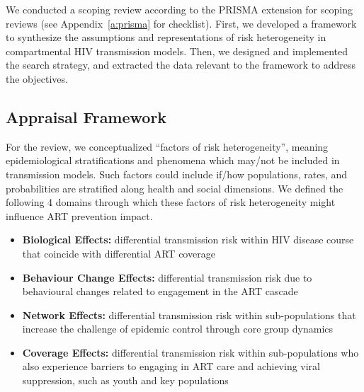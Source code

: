 We conducted a scoping review according to the PRISMA extension for scoping reviews
(see Appendix~\ref{a:prisma} for checklist).
First, we developed a framework to synthesize  %
the assumptions and representations of risk heterogeneity
in compartmental HIV transmission models.
Then, we designed and implemented the search strategy,
and extracted the data relevant to the framework
to address the objectives.
\subsection{Appraisal Framework}  %
\label{ss:meth:framework}
For the review, we conceptualized ``factors of risk heterogeneity'', meaning
epidemiological stratifications and phenomena which may/not be included in transmission models.
Such factors could include if/how populations, rates, and probabilities
are stratified along health and social dimensions.
We defined the following 4 domains through which
these factors of risk heterogeneity might influence ART prevention impact.
\begin{itemize}
  \item \textbf{Biological Effects:}
  differential transmission risk within HIV disease course
  that coincide with differential ART coverage
  \cite{Pilcher2004}
  \item \textbf{Behaviour Change Effects:}
  differential transmission risk due to
  behavioural changes related to engagement in the ART cascade
  \cite{Ramachandran2016,Tiwari2020} %
  \item \textbf{Network Effects:}
  differential transmission risk within sub-populations
  that increase the challenge of epidemic control through core group dynamics
  \cite{Anderson1986,Boily1997,Watts2010,Dodd2010}
  \item \textbf{Coverage Effects:}
  differential transmission risk within sub-populations
  who also experience barriers to engaging in ART care and achieving viral suppression,
  such as youth and key populations
  \cite{Mountain2014,Lancaster2016,Hakim2018,Green2020}
\end{itemize}
